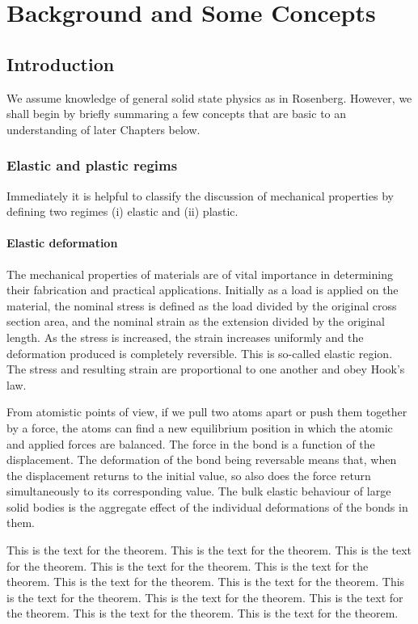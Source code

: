 
\chapter{Background and Some Concepts} %

\section{Introduction} %
We assume knowledge of general solid state physics as in Rosenberg. 
However, we shall begin by briefly summaring a few concepts that are 
basic to an understanding of later Chapters below.

\subsection{Elastic and plastic regims} %
Immediately it is helpful to classify the discussion of mechanical
properties by defining two regimes (i) elastic and (ii) plastic.

\subsubsection{Elastic deformation} %
The mechanical properties of materials are of vital importance 
in determining their fabrication and practical applications. Initially 
as a load is applied on the material, the nominal stress is defined as 
the load divided by the original cross section area, and the nominal 
strain as the extension divided by the original length. As the stress 
is increased, the strain increases uniformly and the deformation 
produced is completely reversible. This is so-called elastic region. 
The stress and resulting strain are proportional to one another and 
obey Hook's law.

From atomistic points of view, if we pull two atoms apart or push 
them together by a force, the atoms can find a new equilibrium 
position in which the atomic and applied forces are balanced. The 
force in the bond is a function of the displacement. The deformation 
of the bond being reversable means that, when the displacement 
returns to the initial value, so also does the force return 
simultaneously to its corresponding value. The bulk elastic 
behaviour of large solid bodies is the aggregate effect of the 
individual deformations of the bonds in them.

\begin{theorem}  %
This is the text for the theorem. This is the text for the
theorem. This is the text for the theorem. This is the text for the
theorem. This is the text for the theorem. This is the text for the
theorem. This is the text for the theorem. This is the text for the
theorem. This is the text for the theorem. This is the text for the
theorem. This is the text for the theorem. This is the text for the
theorem.
\end{theorem}

